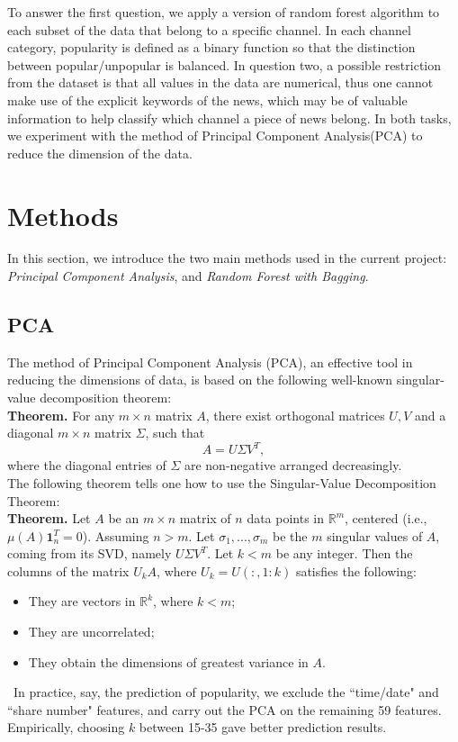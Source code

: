 \documentclass{article} %
\def\R{\mathbb{R}}
\begin{document}
To answer the first question, we apply a version of random forest algorithm to each subset of the data that belong to a specific channel. In each channel category, popularity is defined as a binary function so
that the distinction between popular/unpopular is balanced.
In question two, a possible restriction from the dataset is that all values in the data are numerical, thus one cannot make use of the explicit keywords of the news, which may be of valuable information to help
classify which channel a piece of news belong. In both tasks, we experiment with the method of Principal Component Analysis(PCA) to reduce the dimension of the data.

\section{Methods}
In this section, we introduce the two main methods used in the current project: {\it Principal Component Analysis}, and {\it Random Forest with Bagging}.
\subsection{PCA}

The method of Principal Component Analysis (PCA), an effective tool in reducing the dimensions of data, is based on the following well-known singular-value
decomposition theorem:
\\

\textbf{Theorem.} For any $m\times n$ matrix $A$, there exist orthogonal matrices $U,V$ and a 
diagonal $m\times n$ matrix $\Sigma$, such that
			\[
				A = U\Sigma V^T,
			\]
where the diagonal entries of $\Sigma$ are non-negative arranged decreasingly.	
\\

The following theorem tells one how to use the Singular-Value Decomposition Theorem:
\\

\textbf{Theorem.} Let $A$ be an $m\times n$ matrix of $n$ data points in $\R^m$, centered (i.e., $\mu(A)\textbf{1}_n^T = 0$). Assuming $n>m$. Let $\sigma_1,...,\sigma_m$ be the $m$ singular
values of $A$, coming from its SVD, namely $U\Sigma V^T$. Let $k<m$ be any integer. Then the columns of the matrix $U_kA$, where $U_k = U(:, 1:k)$ satisfies the following:
\begin{itemize}
	\item{They are vectors in $\R^k$, where $k<m$;}
	\item{They are uncorrelated;}
	\item{They obtain the dimensions of greatest variance in $A$.}
\end{itemize}
\
In practice, say, the prediction of popularity, we exclude the ``time/date" and ``share number" features, and carry out the PCA on the remaining 59 features. Empirically, choosing $k$ between 15-35 gave
better prediction results.
\end{document}
